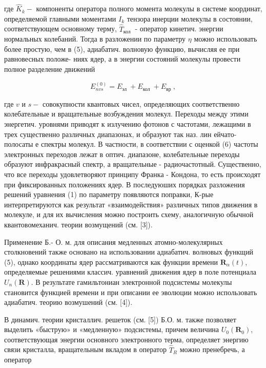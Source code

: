 \documentclass[10pt]{article}
\begin{document}
где $\hat{K}_{k}-$ компоненты оператора полного момента молекулы в системе координат, определяемой главными моментами $I_{k}$ тензора инерции молекулы в состоянии, соответствующем основному терму, $\hat{T}_{\text {кол }}$ - оператор кинетич. энергии нормальных колебаний. Тогда в разложении по параметру $\eta$ можно использовать более простую, чем в (5), адиабатич. волновую функцию, вычисляя ее при равновесных положе- ниях ядер, а в энергии состояний молекулы провести полное разделение движений



\[

E_{n v s}^{(0)}=E_{\text {эл }}+E_{\text {кол }}+E_{\text {вр }},

\]



где $v$ и $s-$ совокупности квантовых чисел, определяющих соответственно колебательные и вращательные возбуждения молекул. Переходы между этими энергетич. уровнями приводят к излучению фотонов с частотами, лежащими в трех существенно различных диапазонах, и образуют так наз. лин ейчато-полосаты е спектры молекул. В частности, в соответствии с оценкой (6) частоты электронных переходов лежат в оптич. диапазоне, колебательные переходы образуют инфракрасный спектр, а вращательные - радиочастотный. Существенно, что все переходы удовлетворяют принципу Франка - Кондона, то есть происходят при фиксированных положениях ядер. В последуюших порядках разложения решений уравнения (1) по параметру появляются поправки, К-рые интерпретируются как результат «взаимодействия» различных типов движения в молекуле, и для их вычисления можно построить схему, аналогичную обычной квантовомеханич. теории возмущений (см. [3]).



Применение Б.- О. м. для описания медленных атомно-молекулярных столкновений также основано на использовании адиабатич. волновых функщий (5), однако координаты ядер рассматриваются как функции времени $\boldsymbol{R}_{\alpha}(t)$, определяемые решениями классич. уравнений движения ядер в поле потенциала $U_{n}(\boldsymbol{R})$. В результате гамильтониан электронной подсистемы молекулы становится функцией времени и при описании ее эволюции можно использовать адиабатич. теорию возмушений (см. [4]).



В динамич. теории кристаллич. решеток (см. [5]) Б.О. м. также позволяет выделить «быструю» и «медленную» подсистемы, причем величина $U_{0}\left(\boldsymbol{R}_{0}\right)$, соответствующая энергии основного электронного терма, определяет энергию связи кристалла, вращательным вкладом в оператор $\hat{T}_{R}$ можно пренебречь, а оператор
\end{document}
